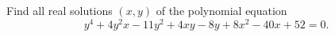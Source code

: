 Find all real solutions $(x, y)$ of the polynomial equation
\[ y^4 + 4y^2x - 11y^2 + 4xy - 8y + 8x^2 - 40x + 52 = 0. \]
